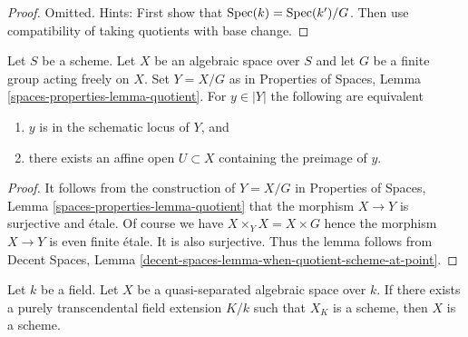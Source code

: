 \begin{proof}
Omitted. Hints: First show that $\mathop{\mathrm{Spec}}(k) = \mathop{\mathrm{Spec}}(k')/G$.
Then use compatibility of taking quotients with base change.
\end{proof}

\begin{lemma}
\label{lemma-when-quotient-scheme-at-point}
Let $S$ be a scheme. Let $X$ be an algebraic space over $S$ and
let $G$ be a finite group acting freely on $X$. Set $Y = X/G$ as
in Properties of Spaces, Lemma \ref{spaces-properties-lemma-quotient}.
For $y \in |Y|$ the following are equivalent
\begin{enumerate}
\item $y$ is in the schematic locus of $Y$, and
\item there exists an affine open $U \subset X$
containing the preimage of $y$.
\end{enumerate}
\end{lemma}

\begin{proof}
It follows from the construction of $Y = X/G$ in
Properties of Spaces, Lemma \ref{spaces-properties-lemma-quotient}
that the morphism $X \to Y$ is surjective and \'etale.
Of course we have $X \times_Y X = X \times G$ hence the morphism
$X \to Y$ is even finite \'etale. It is also surjective.
Thus the lemma follows from
Decent Spaces, Lemma \ref{decent-spaces-lemma-when-quotient-scheme-at-point}.
\end{proof}

\begin{lemma}
\label{lemma-scheme-after-purely-transcendental-base-change}
Let $k$ be a field. Let $X$ be a quasi-separated
algebraic space over $k$. If there exists a purely transcendental
field extension $K/k$ such that $X_K$ is a scheme, then
$X$ is a scheme.
\end{lemma}

